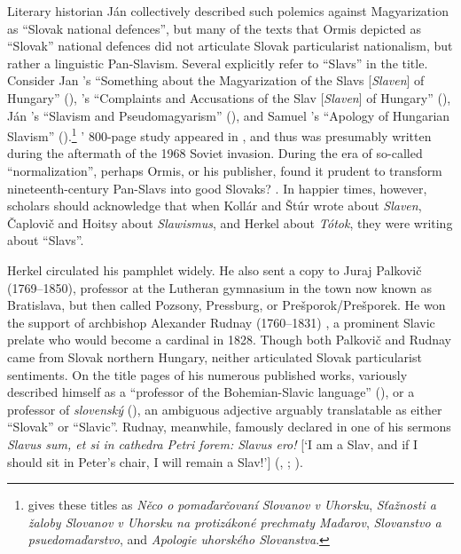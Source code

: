 Literary historian Ján \citet{ormis_o_1973} collectively described such polemics \linebreak{}against Magyarization as “Slovak national defences”, but many of the texts that Ormis depicted as “Slovak” national defences did not articulate Slovak particularist nationalism, but rather a linguistic Pan-Slavism. Several explicitly refer to “Slavs” in the title. Consider Jan \citeauthor{kollar_etwas_1821}’s “Something about the Magyarization of the Slavs [\textit{Slaven}] of Hungary” (\citeyear[552--558]{kollar_etwas_1821}), \citeauthor{stur_beschwerden_1843}’s “Complaints and Accusations of the Slav [\textit{Slaven}] of Hungary” (\citeyear{stur_beschwerden_1843}), Ján \citeauthor{caplovic_slawismus_1842}’s “Slavism and Pseudomagyarism” (\citeyear{caplovic_slawismus_1842}), and Samuel \citeauthor{hoitsy_apologie_1843}’s “Apology of Hungarian Slavism” (\citeyear{hoitsy_apologie_1843}).\footnote{\citet[169--176, 515--594, 595--665]{ormis_o_1973} gives these titles as \textit{Něco o pomaďarčovaní Slovanov v Uhorsku}, \textit{Sťažnosti a žaloby Slovanov v Uhorsku na protizákoné prechmaty Maďarov}, \textit{Slovanstvo a psuedomaďarstvo}, and \textit{Apologie uhorského Slovanstva}.} \citeauthor{ormis_o_1973}’ 800-page study appeared in \citeyear{ormis_o_1973}, and thus was presumably written during the aftermath of the 1968 Soviet invasion. During the era of so-called “normalization”, perhaps Ormis, or his publisher, found it prudent to transform nineteenth-century Pan-Slavs into good Slovaks? \citep[207--211]{taborsky_czechoslovakias_1973}. In happier times, however, scholars should acknowledge that when Kollár and Štúr wrote about \textit{Slaven}, Čaplovič and Hoitsy about \textit{Slawismus}, and Herkel about \textit{Tótok}, they were writing about “Slavs”.

Herkel circulated his pamphlet widely. He also sent a copy to Juraj Palkovič (1769--1850), professor at the Lutheran gymnasium in the town now known as Bratislava, but then called Pozsony, Pressburg, or Prešporok/Prešporek. He won the support of archbishop Alexander Rudnay (1760--1831) \citep[16]{macho_jazyk_2002}, a prominent Slavic prelate who would become a cardinal in 1828. Though both Palkovič and Rudnay came from Slovak northern Hungary, neither articulated Slovak particularist sentiments. On the title pages of his numerous published works, \citeauthor{palkovic_bohmisch-deutsch-lateinisches_18201821} variously described himself as a “professor of the Bohemian-Sla\-vic language” (\citeyear{palkovic_bohmisch-deutsch-lateinisches_18201821, palkovic_bestreitung_1830}), or a professor of \textit{slovenský} (\citeyear{palkovic_wytah_1808, palkovic_tatranka_1832}), an ambiguous adjective arguably translatable as either “Slovak” or “Slavic”. Rudnay, meanwhile, famously declared in one of his sermons \textit{Slavus sum, et si in cathedra Petri forem: Slavus ero!} [‘I am a Slav, and if I should sit in Peter’s chair, I will remain a Slav!’] (, \cite[122]{anon_alexander_1863}; \cite[156]{precechtel_ceskoslovansky_1872}).


